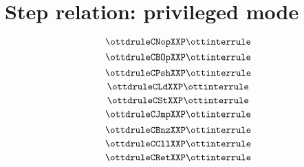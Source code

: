 \documentclass{article}
\begin{document}
\section*{Step relation: privileged mode}

\[ \ottdruleCNopXXP \ottinterrule \]
\[ \ottdruleCBOpXXP \ottinterrule \]
\[ \ottdruleCPshXXP \ottinterrule \]
\[ \ottdruleCLdXXP \ottinterrule \]
\[ \ottdruleCStXXP \ottinterrule \]
\[ \ottdruleCJmpXXP \ottinterrule \]
\[ \ottdruleCBnzXXP \ottinterrule \] 
\[ \ottdruleCCllXXP \ottinterrule \]
\[ \ottdruleCRetXXP \ottinterrule \] 


\end{document}
